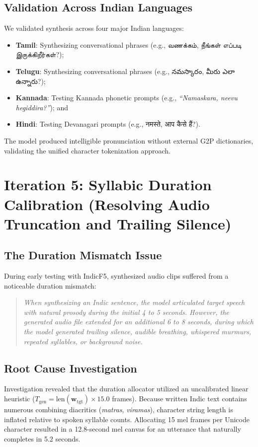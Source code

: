 \subsection{Validation Across Indian Languages}
We validated synthesis across four major Indian languages:
\begin{itemize}
    \item \textbf{Tamil}: Synthesizing conversational phrases (e.g., {\tamilfont வணக்கம், நீங்கள் எப்படி இருக்கிறீர்கள்?});
    \item \textbf{Telugu}: Synthesizing conversational phrases (e.g., {\telugufont నమస్కారం, మీరు ఎలా ఉన్నారు?});
    \item \textbf{Kannada}: Testing Kannada phonetic prompts (e.g., \textit{``Namaskara, neevu hegiddira?''}); and
    \item \textbf{Hindi}: Testing Devanagari prompts (e.g., {\indicfont नमस्ते, आप कैसे हैं?}).
\end{itemize}
The model produced intelligible pronunciation without external G2P dictionaries, validating the unified character tokenization approach.

\section{Iteration 5: Syllabic Duration Calibration (Resolving Audio Truncation and Trailing Silence)}
\subsection{The Duration Mismatch Issue}
During early testing with IndicF5, synthesized audio clips suffered from a noticeable duration mismatch:
\begin{quote}
\textit{When synthesizing an Indic sentence, the model articulated target speech with natural prosody during the initial 4 to 5 seconds. However, the generated audio file extended for an additional 6 to 8 seconds, during which the model generated trailing silence, audible breathing, whispered murmurs, repeated syllables, or background noise.}
\end{quote}

\subsection{Root Cause Investigation}
Investigation revealed that the duration allocator utilized an uncalibrated linear heuristic ($T_{\text{gen}} = \text{len}(\mathbf{w}_{\text{tgt}}) \times 15.0$ frames). Because written Indic text contains numerous combining diacritics (\textit{matras}, \textit{viramas}), character string length is inflated relative to spoken syllable counts. Allocating 15 mel frames per Unicode character resulted in a 12.8-second mel canvas for an utterance that naturally completes in 5.2 seconds. 

